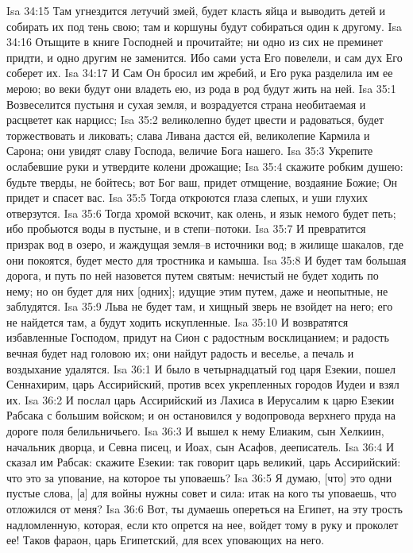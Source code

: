 Isa 34:15  Там угнездится летучий змей, будет класть яйца и выводить детей и собирать их под тень свою; там и коршуны будут собираться один к другому.
Isa 34:16  Отыщите в книге Господней и прочитайте; ни одно из сих не преминет придти, и одно другим не заменится. Ибо сами уста Его повелели, и сам дух Его соберет их.
Isa 34:17  И Сам Он бросил им жребий, и Его рука разделила им ее мерою; во веки будут они владеть ею, из рода в род будут жить на ней.
Isa 35:1  Возвеселится пустыня и сухая земля, и возрадуется страна необитаемая и расцветет как нарцисс;
Isa 35:2  великолепно будет цвести и радоваться, будет торжествовать и ликовать; слава Ливана дастся ей, великолепие Кармила и Сарона; они увидят славу Господа, величие Бога нашего.
Isa 35:3  Укрепите ослабевшие руки и утвердите колени дрожащие;
Isa 35:4  скажите робким душею: будьте тверды, не бойтесь; вот Бог ваш, придет отмщение, воздаяние Божие; Он придет и спасет вас.
Isa 35:5  Тогда откроются глаза слепых, и уши глухих отверзутся.
Isa 35:6  Тогда хромой вскочит, как олень, и язык немого будет петь; ибо пробьются воды в пустыне, и в степи--потоки.
Isa 35:7  И превратится призрак вод в озеро, и жаждущая земля--в источники вод; в жилище шакалов, где они покоятся, будет место для тростника и камыша.
Isa 35:8  И будет там большая дорога, и путь по ней назовется путем святым: нечистый не будет ходить по нему; но он будет для них [одних]; идущие этим путем, даже и неопытные, не заблудятся.
Isa 35:9  Льва не будет там, и хищный зверь не взойдет на него; его не найдется там, а будут ходить искупленные.
Isa 35:10  И возвратятся избавленные Господом, придут на Сион с радостным восклицанием; и радость вечная будет над головою их; они найдут радость и веселье, а печаль и воздыхание удалятся.
Isa 36:1  И было в четырнадцатый год царя Езекии, пошел Сеннахирим, царь Ассирийский, против всех укрепленных городов Иудеи и взял их.
Isa 36:2  И послал царь Ассирийский из Лахиса в Иерусалим к царю Езекии Рабсака с большим войском; и он остановился у водопровода верхнего пруда на дороге поля белильничьего.
Isa 36:3  И вышел к нему Елиаким, сын Хелкиин, начальник дворца, и Севна писец, и Иоах, сын Асафов, дееписатель.
Isa 36:4  И сказал им Рабсак: скажите Езекии: так говорит царь великий, царь Ассирийский: что это за упование, на которое ты уповаешь?
Isa 36:5  Я думаю, [что] это одни пустые слова, [а] для войны нужны совет и сила: итак на кого ты уповаешь, что отложился от меня?
Isa 36:6  Вот, ты думаешь опереться на Египет, на эту трость надломленную, которая, если кто опрется на нее, войдет тому в руку и проколет ее! Таков фараон, царь Египетский, для всех уповающих на него.
